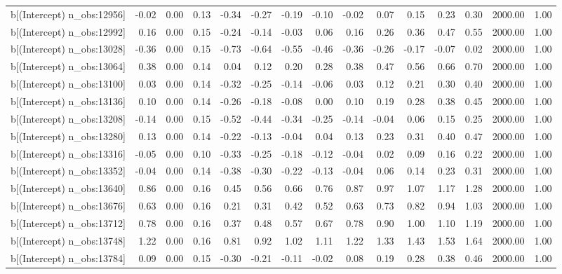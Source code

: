\begin{table}[ht]
\begin{tabular}{rrrrrrrrrrrrrrr}
  b[(Intercept) n\_obs:12956] & -0.02 & 0.00 & 0.13 & -0.34 & -0.27 & -0.19 & -0.10 & -0.02 & 0.07 & 0.15 & 0.23 & 0.30 & 2000.00 & 1.00 \\ 
  b[(Intercept) n\_obs:12992] & 0.16 & 0.00 & 0.15 & -0.24 & -0.14 & -0.03 & 0.06 & 0.16 & 0.26 & 0.36 & 0.47 & 0.55 & 2000.00 & 1.00 \\ 
  b[(Intercept) n\_obs:13028] & -0.36 & 0.00 & 0.15 & -0.73 & -0.64 & -0.55 & -0.46 & -0.36 & -0.26 & -0.17 & -0.07 & 0.02 & 2000.00 & 1.00 \\ 
  b[(Intercept) n\_obs:13064] & 0.38 & 0.00 & 0.14 & 0.04 & 0.12 & 0.20 & 0.28 & 0.38 & 0.47 & 0.56 & 0.66 & 0.70 & 2000.00 & 1.00 \\ 
  b[(Intercept) n\_obs:13100] & 0.03 & 0.00 & 0.14 & -0.32 & -0.25 & -0.14 & -0.06 & 0.03 & 0.12 & 0.21 & 0.30 & 0.40 & 2000.00 & 1.00 \\ 
  b[(Intercept) n\_obs:13136] & 0.10 & 0.00 & 0.14 & -0.26 & -0.18 & -0.08 & 0.00 & 0.10 & 0.19 & 0.28 & 0.38 & 0.45 & 2000.00 & 1.00 \\ 
  b[(Intercept) n\_obs:13208] & -0.14 & 0.00 & 0.15 & -0.52 & -0.44 & -0.34 & -0.25 & -0.14 & -0.04 & 0.06 & 0.15 & 0.25 & 2000.00 & 1.00 \\ 
  b[(Intercept) n\_obs:13280] & 0.13 & 0.00 & 0.14 & -0.22 & -0.13 & -0.04 & 0.04 & 0.13 & 0.23 & 0.31 & 0.40 & 0.47 & 2000.00 & 1.00 \\ 
  b[(Intercept) n\_obs:13316] & -0.05 & 0.00 & 0.10 & -0.33 & -0.25 & -0.18 & -0.12 & -0.04 & 0.02 & 0.09 & 0.16 & 0.22 & 2000.00 & 1.00 \\ 
  b[(Intercept) n\_obs:13352] & -0.04 & 0.00 & 0.14 & -0.38 & -0.30 & -0.22 & -0.13 & -0.04 & 0.06 & 0.14 & 0.23 & 0.31 & 2000.00 & 1.00 \\ 
  b[(Intercept) n\_obs:13640] & 0.86 & 0.00 & 0.16 & 0.45 & 0.56 & 0.66 & 0.76 & 0.87 & 0.97 & 1.07 & 1.17 & 1.28 & 2000.00 & 1.00 \\ 
  b[(Intercept) n\_obs:13676] & 0.63 & 0.00 & 0.16 & 0.21 & 0.31 & 0.42 & 0.52 & 0.63 & 0.73 & 0.82 & 0.94 & 1.03 & 2000.00 & 1.00 \\ 
  b[(Intercept) n\_obs:13712] & 0.78 & 0.00 & 0.16 & 0.37 & 0.48 & 0.57 & 0.67 & 0.78 & 0.90 & 1.00 & 1.10 & 1.19 & 2000.00 & 1.00 \\ 
  b[(Intercept) n\_obs:13748] & 1.22 & 0.00 & 0.16 & 0.81 & 0.92 & 1.02 & 1.11 & 1.22 & 1.33 & 1.43 & 1.53 & 1.64 & 2000.00 & 1.00 \\ 
  b[(Intercept) n\_obs:13784] & 0.09 & 0.00 & 0.15 & -0.30 & -0.21 & -0.11 & -0.02 & 0.08 & 0.19 & 0.28 & 0.38 & 0.46 & 2000.00 & 1.00 \\ 

\end{tabular}
\end{table}
